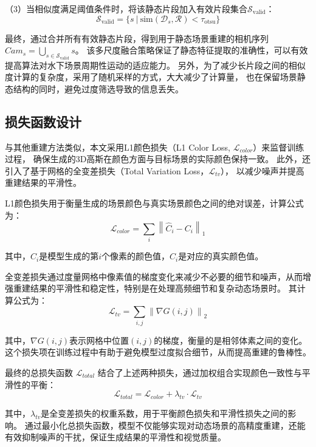 （3）当相似度满足阈值条件时，将该静态片段加入有效片段集合$\mathcal{S}_{\text{valid}}$：
\begin{equation}
\mathcal{S}_{\text{valid}} = \{s \ | \ \text{sim}(\mathcal{D}_s, \mathcal{R}) < \tau_{\text{otsu}}\}
\end{equation}

最终，通过合并所有有效静态片段，得到用于静态场景重建的相机序列$Cam_s=\bigcup_{s\in\mathcal{S}_{\text{valid}}}s$。
该多尺度融合策略保证了静态特征提取的准确性，可以有效提高算法对水下场景周期性运动的适应能力。
另外，为了减少长片段之间的相似度计算的复杂度，采用了随机采样的方式，大大减少了计算量，
也在保留场景静态结构的同时，避免过度筛选导致的信息丢失。

\subsection{损失函数设计}
与其他重建方法类似\cite{3DGS}\cite{tineuvox}\cite{dnerf}，本文采用L1颜色损失（L1 Color Loss, $\mathcal{L}_{color}$）来监督训练过程，
确保生成的3D高斯在颜色方面与目标场景的实际颜色保持一致。
此外，还引入了基于网格的全变差损失（Total Variation Loss，$\mathcal{L}_{tv}$），
以减少噪声并提高重建结果的平滑性。

L1颜色损失用于衡量生成的场景颜色与真实场景颜色之间的绝对误差，计算公式为：
\begin{equation}
    \mathcal{L}_{color} = \sum_{i} \left\| \hat{C}_i - C_i \right\|_1
\end{equation}

其中，$\hat{C}_i$是模型生成的第$i$个像素的颜色值，$C_i$是对应的真实颜色值。

全变差损失通过度量网格中像素值的梯度变化来减少不必要的细节和噪声，从而增强重建结果的平滑性和稳定性，特别是在处理高频细节和复杂动态场景时。
其计算公式为：
\begin{equation}
    \mathcal{L}_{tv} = \sum_{i,j} \left\| \nabla G(i,j) \right\|_2
\end{equation}

其中，$\nabla G(i,j)$表示网格中位置$(i,j)$的梯度，衡量的是相邻体素之间的变化。这个损失项在训练过程中有助于避免模型过度拟合细节，从而提高重建的鲁棒性。

最终的总损失函数 $\mathcal{L}_{total}$ 结合了上述两种损失，通过加权组合实现颜色一致性与平滑性的平衡：
$$
\mathcal{L}_{total} = \mathcal{L}_{color} + \lambda_{tv} \cdot \mathcal{L}_{tv}
$$

其中，$\lambda_{tv}$是全变差损失的权重系数，用于平衡颜色损失和平滑性损失之间的影响。
通过最小化总损失函数，模型不仅能够实现对动态场景的高精度重建，还能有效抑制噪声的干扰，保证生成结果的平滑性和视觉质量。

